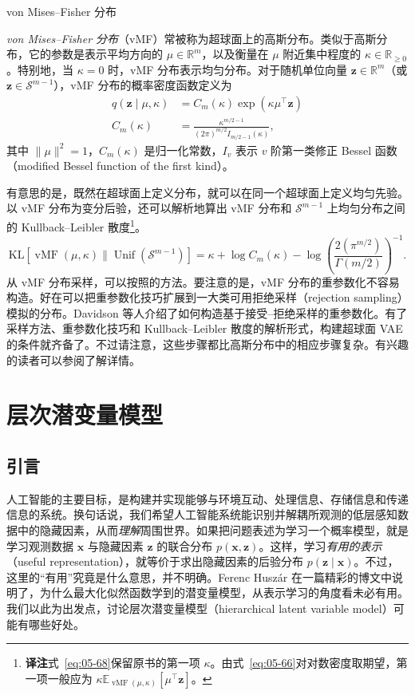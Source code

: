 \medskip\noindent von Mises–Fisher 分布\par\smallskip
\emph{von Mises–Fisher 分布}（vMF）常被称为超球面上的高斯分布。类似于高斯分布，它的参数是表示平均方向的 $\mu\in\mathbb{R}^m$，以及衡量在 $\mu$ 附近集中程度的 $\kappa\in\mathbb{R}_{\geq 0}$。特别地，当 $\kappa=0$ 时，vMF 分布表示均匀分布。对于随机单位向量 $\mathbf{z}\in\mathbb{R}^m$（或 $\mathbf{z}\in\mathcal{S}^{m-1}$），vMF 分布的概率密度函数定义为
\begin{align}
q(\mathbf{z}\mid\mu,\kappa)&=C_m(\kappa)\exp(\kappa\mu^\top\mathbf{z}) \tag{5.66}\label{eq:05-66}\\
C_m(\kappa)&=\frac{\kappa^{m/2-1}}
 {(2\pi)^{m/2}I_{m/2-1}(\kappa)}, \tag{5.67}\label{eq:05-67}
\end{align}
其中 $\|\mu\|^2=1$，$C_m(\kappa)$ 是归一化常数，$I_v$ 表示 $v$ 阶第一类修正 Bessel 函数（modified Bessel function of the first kind）。

有意思的是，既然在超球面上定义分布，就可以在同一个超球面上定义均匀先验。以 vMF 分布为变分后验，还可以解析地算出 vMF 分布和 $\mathcal{S}^{m-1}$ 上均匀分布之间的 Kullback–Leibler 散度\footnote{\textbf{译注}\quad 式~\eqref{eq:05-68}保留原书的第一项 $\kappa$。由式~\eqref{eq:05-66}对对数密度取期望，第一项一般应为 $\kappa\mathbb{E}_{\operatorname{vMF}(\mu,\kappa)}[\mu^\top\mathbf{z}]$。}。
\begin{equation}
\mathrm{KL}[\operatorname{vMF}(\mu,\kappa)\|\operatorname{Unif}(\mathcal{S}^{m-1})]
 =\kappa+\log C_m(\kappa)-\log\left(\frac{2(\pi^{m/2})}{\Gamma(m/2)}\right)^{-1}.
\tag{5.68}\label{eq:05-68}
\end{equation}
从 vMF 分布采样，可以按照的方法。要注意的是，vMF 分布的重参数化不容易构造。好在可以把重参数化技巧扩展到一大类可用拒绝采样（rejection sampling）模拟的分布。Davidson 等人介绍了如何构造基于接受–拒绝采样的重参数化。有了采样方法、重参数化技巧和 Kullback–Leibler 散度的解析形式，构建超球面 VAE 的条件就齐备了。不过请注意，这些步骤都比高斯分布中的相应步骤复杂。有兴趣的读者可以参阅了解详情。

\section{层次潜变量模型}
\label{sec:hierarchical-vae}
\subsection{引言}
人工智能的主要目标，是构建并实现能够与环境互动、处理信息、存储信息和传递信息的系统。换句话说，我们希望人工智能系统能识别并解耦所观测的低层感知数据中的隐藏因素，从而\emph{理解}周围世界。如果把问题表述为学习一个概率模型，就是学习观测数据 $\mathbf{x}$ 与隐藏因素 $\mathbf{z}$ 的联合分布 $p(\mathbf{x},\mathbf{z})$。这样，学习\emph{有用的表示}（useful representation），就等价于求出隐藏因素的后验分布 $p(\mathbf{z}\mid\mathbf{x})$。不过，这里的“有用”究竟是什么意思，并不明确。Ferenc Huszár 在一篇精彩的博文中说明了，为什么最大化似然函数学到的潜变量模型，从表示学习的角度看未必有用。我们以此为出发点，讨论层次潜变量模型（hierarchical latent variable model）可能有哪些好处。

